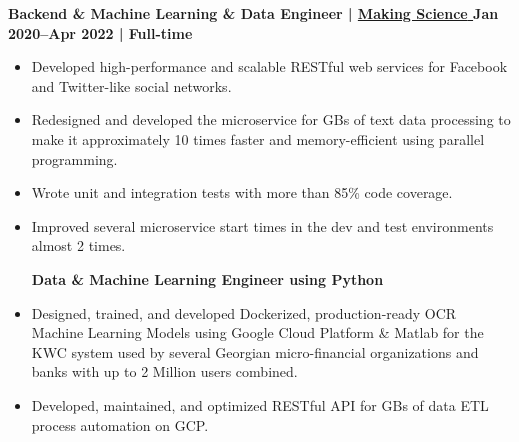\textbf{Backend \& Machine Learning \& Data Engineer | 
\href{https://www.makingscience.com/}{
    {Making Science} 
} \hfill Jan 2020--Apr 2022 | Full-time}

\par
\begin{itemize}[label=$\bullet$] 
    \centerline {\textbf{Go Engineer}}
    \item Developed high-performance and scalable RESTful web services for Facebook and Twitter-like social networks.
    \item Redesigned and developed the microservice for GBs of text data processing to make it approximately 10 times faster and memory-efficient using parallel programming.
    \item Wrote unit and integration tests with more than 85\% code coverage.
    \item Improved several microservice start times in the dev and test environments almost 2 times. \newline

    \centerline {\textbf{Data \& Machine Learning Engineer using Python}}
    \item Designed, trained, and developed Dockerized, production-ready OCR Machine Learning Models using Google Cloud Platform \& Matlab for the KWC system used by several Georgian micro-financial organizations and banks with up to 2 Million users combined.
    \item Developed, maintained, and optimized RESTful API for GBs of data ETL process automation on GCP.
\end{itemize}\par
